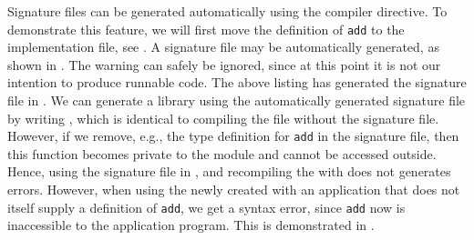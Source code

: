 \documentclass[springer.tex]{subfiles}
\begin{document}
Signature files can be generated automatically using the  compiler directive. To demonstrate this feature, we will first move the definition of \lstinline{add} to the implementation file, see .
%
%
A signature file may be automatically generated, as shown in .
%
%
The warning can safely be ignored, since at this point it is not our intention to produce runnable code. The above listing has generated the signature file in .
%
%
We can generate a library using the automatically generated signature file by writing , which is identical to compiling the  file without the signature file. However, if we remove, e.g., the type definition for \lstinline{add} in the signature file, then this function becomes private to the module and cannot be accessed outside. Hence, using the signature file in , and recompiling the  with  does not generates errors. 
%
%
%
%
However, when using the newly created  with an application that does not itself supply a definition of \lstinline{add}, we get a syntax error, since \lstinline{add} now is inaccessible to the application program. This is demonstrated in .
%
%
%
\end{document}
